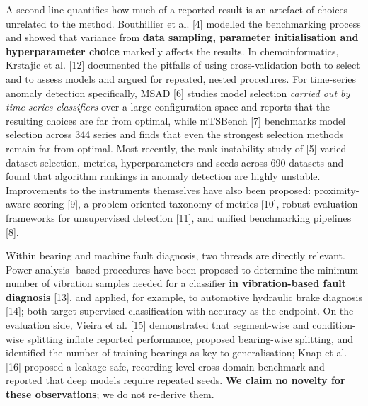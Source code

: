 \documentclass[11pt]{article}
\begin{document}
A second line quantifies how much of a reported result is an artefact of choices unrelated to the method. Bouthillier et al. [4] modelled the benchmarking process and showed that variance from \textbf{data sampling, parameter initialisation and hyperparameter choice} markedly affects the results. In chemoinformatics, Krstajic et al. [12] documented the pitfalls of using cross-validation both to select and to assess models and argued for repeated, nested procedures. For time-series anomaly detection specifically, MSAD [6] studies model selection \emph{carried out by time-series classifiers} over a large configuration space and reports that the resulting choices are far from optimal, while mTSBench [7] benchmarks model selection across 344 series and finds that even the strongest selection methods remain far from optimal. Most recently, the rank-instability study of [5] varied dataset selection, metrics, hyperparameters and seeds across 690 datasets and found that algorithm rankings in anomaly detection are highly unstable. Improvements to the instruments themselves have also been proposed: proximity-aware scoring [9], a problem-oriented taxonomy of metrics [10], robust evaluation frameworks for unsupervised detection [11], and unified benchmarking pipelines [8].

Within bearing and machine fault diagnosis, two threads are directly relevant. Power-analysis- based procedures have been proposed to determine the minimum number of vibration samples needed for a classifier \textbf{in vibration-based fault diagnosis} [13], and applied, for example, to automotive hydraulic brake diagnosis [14]; both target supervised classification with accuracy as the endpoint. On the evaluation side, Vieira et al. [15] demonstrated that segment-wise and condition-wise splitting inflate reported performance, proposed bearing-wise splitting, and identified the number of training bearings as key to generalisation; Knap et al. [16] proposed a leakage-safe, recording-level cross-domain benchmark and reported that deep models require repeated seeds. \textbf{We claim no novelty for these observations}; we do not re-derive them.
\end{document}
